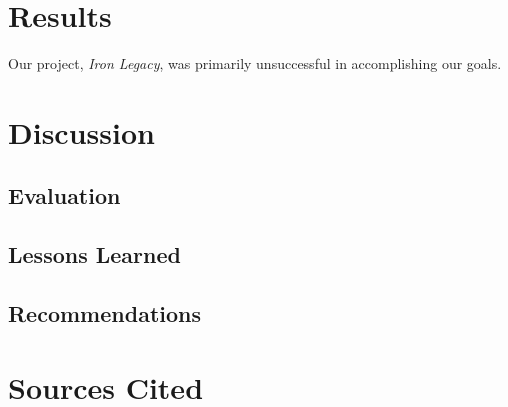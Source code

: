\documentclass{article}
\begin{document}
\section*{Results}

Our project, \emph{Iron Legacy}, was primarily unsuccessful in
    accomplishing our goals.

\section*{Discussion}


\subsection*{Evaluation}

\subsection*{Lessons Learned}

\subsection*{Recommendations}

\section*{Sources Cited}
\end{document}
